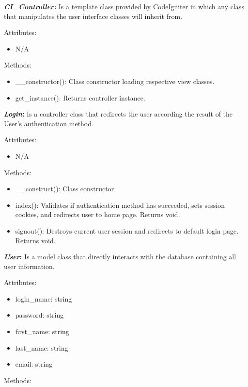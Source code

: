 \textbf{\emph{CI\_Controller:}} Is a template class provided by
CodeIgniter in which any class that manipulates the user interface
classes will inherit from.

Attributes:

\begin{itemize}
\item
  N/A
\end{itemize}

Methods:

\begin{itemize}
\item
  \_\_constructor(): Class constructor loading respective view classes.
\item
  get\_instance(): Returns controller instance.
\end{itemize}

\textbf{\emph{Login}:} Is a controller class that redirects the user
according the result of the User's authentication method.

Attributes:

\begin{itemize}
\item
  N/A
\end{itemize}

Methods:

\begin{itemize}
\item
  \_\_construct(): Class constructor
\item
  index(): Validates if authentication method has succeeded, sets
  session cookies, and redirects user to home page. Returns void.
\item
  signout(): Destroys current user session and redirects to default
  login page. Returns void.
\end{itemize}

\textbf{\emph{User}:} Is a model class that directly interacts with the
database containing all user information.

Attributes:

\begin{itemize}
\item
  login\_name: string
\item
  password: string
\item
  first\_name: string
\item
  last\_name: string
\item
  email: string
\end{itemize}

Methods:

